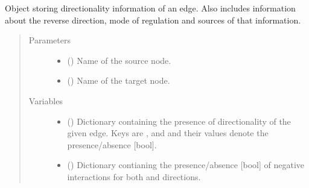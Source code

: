 \documentclass[letterpaper,10pt,english]{sphinxmanual}
\begin{document}
\begin{fulllineitems}

\begin{fulllineitems}
\label{\detokenize{main:pypath.main.PyPath.write_table}}
\end{fulllineitems}


\end{fulllineitems}


\begin{fulllineitems}
\label{\detokenize{main:pypath.main.Direction}}
Object storing directionality information of an edge. Also includes
information about the reverse direction, mode of regulation and
sources of that information.
\begin{quote}\begin{description}
\item[{Parameters}] \leavevmode\begin{itemize}
\item {} 
 () \textendash{} Name of the source node.

\item {} 
 () \textendash{} Name of the target node.

\end{itemize}

\item[{Variables}] \leavevmode\begin{itemize}
\item {} 
 () \textendash{} Dictionary containing the presence of directionality of the
given edge. Keys are ,  and 
and their values denote the presence/absence {[}bool{]}.

\item {} 
 () \textendash{} Dictionary contianing the presence/absence {[}bool{]} of negative
interactions for both  and 
directions.


\end{itemize}
\end{description}
\end{quote}
\end{fulllineitems}
\end{document}

